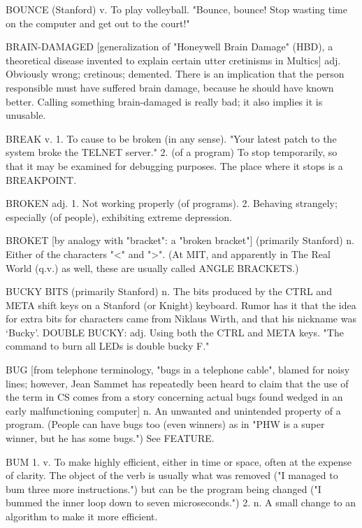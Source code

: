 BOUNCE (Stanford) v. To play volleyball.  "Bounce, bounce!  Stop
   wasting time on the computer and get out to the court!"

BRAIN-DAMAGED [generalization of "Honeywell Brain Damage" (HBD), a
   theoretical disease invented to explain certain utter cretinisms in
   Multics] adj. Obviously wrong; cretinous; demented.	There is an
   implication that the person responsible must have suffered brain
   damage, because he should have known better.	 Calling something
   brain-damaged is really bad; it also implies it is unusable.

BREAK v. 1. To cause to be broken (in any sense).  "Your latest patch
   to the system broke the TELNET server."  2. (of a program) To stop
   temporarily, so that it may be examined for debugging purposes.
   The place where it stops is a BREAKPOINT.

BROKEN adj. 1. Not working properly (of programs).  2. Behaving
   strangely; especially (of people), exhibiting extreme depression.

BROKET [by analogy with "bracket": a "broken bracket"] (primarily
   Stanford) n. Either of the characters "<" and ">".  (At MIT, and
   apparently in The Real World (q.v.) as well, these are usually
   called ANGLE BRACKETS.)

BUCKY BITS (primarily Stanford) n. The bits produced by the CTRL and
   META shift keys on a Stanford (or Knight) keyboard.	Rumor has it
   that the idea for extra bits for characters came from Niklaus
   Wirth, and that his nickname was `Bucky'.
   DOUBLE BUCKY: adj. Using both the CTRL and META keys.  "The command
   to burn all LEDs is double bucky F."

BUG [from telephone terminology, "bugs in a telephone cable", blamed
   for noisy lines; however, Jean Sammet has repeatedly been heard to
   claim that the use of the term in CS comes from a story concerning
   actual bugs found wedged in an early malfunctioning computer] n. An
   unwanted and unintended property of a program.  (People can have
   bugs too (even winners) as in "PHW is a super winner, but he has
   some bugs.")	 See FEATURE.

BUM 1. v. To make highly efficient, either in time or space, often at
   the expense of clarity.  The object of the verb is usually what was
   removed ("I managed to bum three more instructions.") but can be
   the program being changed ("I bummed the inner loop down to seven
   microseconds.")  2. n. A small change to an algorithm to make it
   more efficient.

